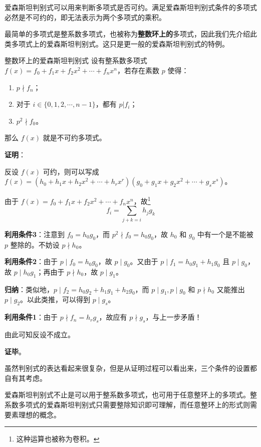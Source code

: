 
爱森斯坦判别式可以用来判断多项式是否可约。满足爱森斯坦判别式条件的多项式必然是不可约的，即无法表示为两个多项式的乘积。

最简单的多项式是整系数多项式，也被称为\textbf{整数环上的}多项式，因此我们先介绍此类多项式上的爱森斯坦判别式。这只是更一般的爱森斯坦判别式的特例。

\begin{theorem}{整数环上的爱森斯坦判别式}\label{the_EsstCr_1}
设有整系数多项式 $f(x)=f_0+f_1x+f_2x^2+\cdots+f_nx^n$，若存在素数 $p$ 使得：
\begin{enumerate}
\item $p\nmid f_n$；
\item 对于 $i\in\{0, 1, 2, \cdots, n-1\}$，都有 $p|f_i$；
\item $p^2\nmid f_0$。
\end{enumerate}
那么 $f(x)$ 就是不可约多项式。
\end{theorem}

\textbf{证明}：

反设 $f(x)$ 可约，则可以写成 $f(x)=(h_0+h_1x+h_2x^2+\cdots+h_rx^r)(g_0+g_1x+g_2x^2+\cdots+g_sx^s)$。

由于 $f(x)=f_0+f_1x+f_2x^2+\cdots+f_nx^n$，故\footnote{这种运算也被称为卷积。}\begin{equation}f_i=\sum\limits_{j+k=i}h_jg_k\end{equation}

\textbf{利用条件3}：注意到 $f_0=h_0g_0$，而 $p^2\nmid f_0=h_0g_0$，故 $h_0$ 和 $g_0$ 中有一个是不能被 $p$ 整除的。不妨设 $p\nmid h_0$。

\textbf{利用条件2}：由于 $p\mid f_0=h_0g_0$，故 $p\mid g_0$。又由于 $p\mid f_1=h_0g_1+h_1g_0$ 且 $p\mid g_0$，故 $p\mid h_0g_1$；再由于 $p\nmid h_0$，故 $p\mid g_1$。

\textbf{归纳}：类似地，$p\mid f_2=h_0g_2+h_1g_1+h_2g_0$，而 $p\mid g_1, p\mid g_0$ 和 $p\nmid h_0$ 又能推出 $p\mid g_2$。以此类推，可以得到 $p\mid g_s$。

\textbf{利用条件1}：由于 $p\nmid f_n=h_rg_s$，故应有 $p\nmid g_s$，与上一步矛盾！

由此可知反设不成立。

\textbf{证毕}。

虽然判别式的表达看起来很复杂，但是从证明过程可以看出来，三个条件的设置都自有其考虑。

爱森斯坦判别式不止是可以用于整系数多项式，也可用于任意整环上的多项式。整系数多项式的爱森斯坦判别式只需要整除知识即可理解，而任意整环上的形式则需要素理想的概念。


